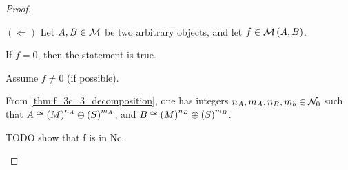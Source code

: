 \begin{proof}
\begin{enumerate}
{            \( ( \Leftarrow ) \) Let \( A, B \in {\mathcal{M}} \) be two arbitrary objects, and let \( f \in {\mathcal{M}}\left(  A, B  \right) \).

            If \( f = 0 \), then the statement is true. 
            
            Assume \( f \neq 0 \) (if possible). %

            From \autoref{thm:f_3c_3_decomposition}, one has integers \( n_A, m_A, n_B, m_b \in {\mathcal{N}}_0 \) such that \( A \cong \left(  M  \right)^{n_A} \oplus \left(  S  \right)^{m_A} \), and \( B \cong \left(  M  \right)^{n_B} \oplus \left(  S  \right)^{m_B} \).

            TODO show that f is in Nc.
        }
    \end{enumerate}
\end{proof}